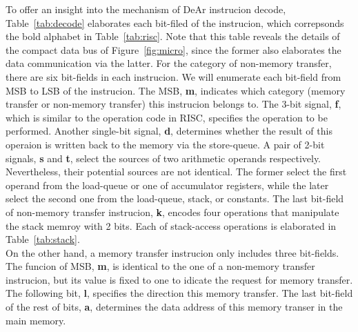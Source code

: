 To offer an insight into the mechanism of DeAr instrucion decode, 
Table~\ref{tab:decode} elaborates each bit-filed of the instrucion, 
which correpsonds the bold alphabet in Table~\ref{tab:risc}.
Note that this table reveals the details of the compact data bus of Figure~\ref{fig:micro}, 
since the former also elaborates the data communication via the latter.
For the category of non-memory transfer, there are six bit-fields in each instrucion.
We will enumerate each bit-field from MSB to LSB of the instrucion.
The MSB, \textbf{m}, indicates which category (memory transfer or non-memory transfer) this instrucion belongs to.
The 3-bit signal, \textbf{f}, which is similar to the operation code in RISC, specifies the operation to be performed.
Another single-bit signal, \textbf{d}, determines whether the result of this operaion is written back to the memory via the store-queue.
A pair of 2-bit signals, \textbf{s} and \textbf{t}, select the sources of two arithmetic operands respectively. 
Nevertheless, their potential sources are not identical.
The former select the first operand from the load-queue or one of accumulator registers, 
while the later select the second one from the load-queue, stack, or constants.
The last bit-field of non-memory transfer instrucion, \textbf{k}, encodes four operations that manipulate the stack memroy with 2 bits.
Each of stack-access operations is elaborated in Table~\ref{tab:stack}.
\\\indent On the other hand, a memory transfer instrucion only includes three bit-fields.
The funcion of MSB, \textbf{m}, is identical to the one of a non-memory transfer instrucion, 
but its value is fixed to one to idicate the request for memory transfer.
The following bit, \textbf{l}, specifies the direction this memory transfer.
The last bit-field of the rest of bits, \textbf{a}, determines the data address of this memory transer in the main memory.
